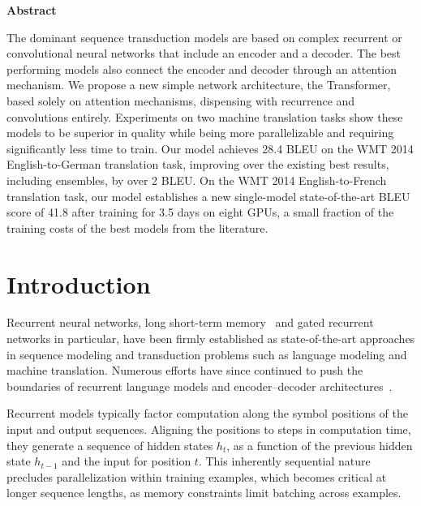 \documentclass[10pt,letterpaper]{article}
\begin{document}
\begin{center}
\begin{minipage}{0.86\textwidth}
  {\centering\textbf{Abstract}\par}
  \vspace{0.4em}
  \small
  The dominant sequence transduction models are based on complex recurrent or
  convolutional neural networks that include an encoder and a decoder. The best
  performing models also connect the encoder and decoder through an attention
  mechanism. We propose a new simple network architecture, the Transformer,
  based solely on attention mechanisms, dispensing with recurrence and
  convolutions entirely. Experiments on two machine translation tasks show these
  models to be superior in quality while being more parallelizable and requiring
  significantly less time to train. Our model achieves 28.4 BLEU on the WMT 2014
  English-to-German translation task, improving over the existing best results,
  including ensembles, by over 2 BLEU. On the WMT 2014 English-to-French
  translation task, our model establishes a new single-model state-of-the-art
  BLEU score of 41.8 after training for 3.5 days on eight GPUs, a small fraction
  of the training costs of the best models from the literature.
\end{minipage}
\end{center}
\vspace{1em}

\section{Introduction}
Recurrent neural networks, long short-term memory~\citep{hochreiter1997long} and
gated recurrent~\citep{cho2014learning} networks in particular, have been firmly
established as state-of-the-art approaches in sequence modeling and transduction
problems such as language modeling and machine translation. Numerous efforts have
since continued to push the boundaries of recurrent language models and
encoder--decoder architectures~\citep{sutskever2014sequence,bahdanau2015neural}.

Recurrent models typically factor computation along the symbol positions of the
input and output sequences. Aligning the positions to steps in computation time,
they generate a sequence of hidden states $h_t$, as a function of the previous
hidden state $h_{t-1}$ and the input for position $t$. This inherently sequential
nature precludes parallelization within training examples, which becomes critical
at longer sequence lengths, as memory constraints limit batching across examples.
\end{document}
